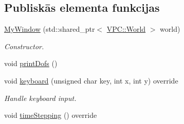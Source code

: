 \subsection*{Publiskās elementa funkcijas}
\begin{DoxyCompactItemize}
\item 
\hyperlink{class_my_window_ab319c71f6000be0f356911276049eb89}{My\+Window} (std\+::shared\+\_\+ptr$<$ \hyperlink{class_v_p_c_1_1_world}{V\+P\+C\+::\+World} $>$ world)
\begin{DoxyCompactList}\small\item\em Constructor. \end{DoxyCompactList}\item 
void \hyperlink{class_my_window_a5cd1724374ca3e5315990f91a16db4b4}{print\+Dofs} ()
\item 
void \hyperlink{class_my_window_a2352b961fdf49a5cd01eefa6a0ba1676}{keyboard} (unsigned char key, int x, int y) override
\begin{DoxyCompactList}\small\item\em Handle keyboard input. \end{DoxyCompactList}\item 
void \hyperlink{class_my_window_af082a7fc8b36683d7b5d2894a094793f}{time\+Stepping} () override
\end{DoxyCompactItemize}
